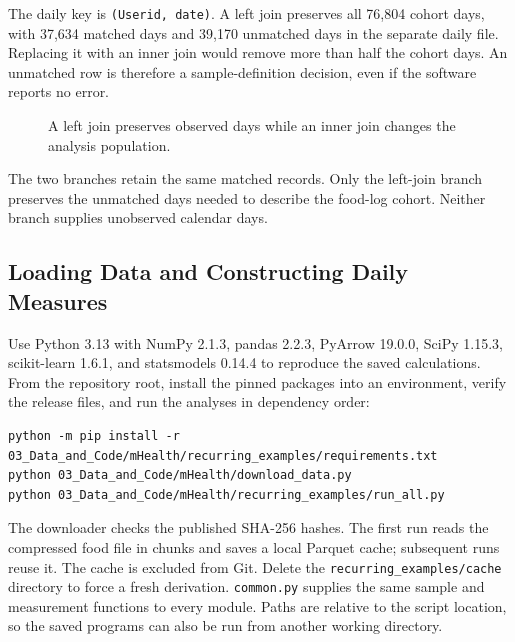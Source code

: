 The daily key is \texttt{(Userid,\ date)}. A left join preserves all
76,804 cohort days, with 37,634 matched days and 39,170 unmatched days
in the separate daily file. Replacing it with an inner join would remove
more than half the cohort days. An unmatched row is therefore a
sample-definition decision, even if the software reports no error.

\begin{figure}[htbp]
\centering

\caption{A left join preserves observed days while an inner join changes the analysis population.}\label{fig:M01_mhealth_join}
\end{figure}

The two branches retain the same matched records. Only the left-join
branch preserves the unmatched days needed to describe the food-log
cohort. Neither branch supplies unobserved calendar days.

\hypertarget{M01-loading-data-and-constructing-daily-measures}{%
\subsection{Loading Data and Constructing Daily
Measures}\label{M01-loading-data-and-constructing-daily-measures}}

\noindent Use Python 3.13 with NumPy 2.1.3, pandas 2.2.3, PyArrow 19.0.0, SciPy
1.15.3, scikit-learn 1.6.1, and statsmodels 0.14.4 to reproduce the
saved calculations. From the repository root, install the pinned
packages into an environment, verify the release files, and run the
analyses in dependency order:

\begin{Verbatim}[breaklines,breakanywhere,fontsize=\small]
python -m pip install -r 03_Data_and_Code/mHealth/recurring_examples/requirements.txt
python 03_Data_and_Code/mHealth/download_data.py
python 03_Data_and_Code/mHealth/recurring_examples/run_all.py
\end{Verbatim}

The downloader checks the published SHA-256 hashes. The first run reads
the compressed food file in chunks and saves a local Parquet cache;
subsequent runs reuse it. The cache is excluded from Git. Delete the
\texttt{recurring\_examples/cache} directory to force a fresh
derivation. \texttt{common.py} supplies the same sample and measurement
functions to every module. Paths are relative to the script location, so
the saved programs can also be run from another working directory.

